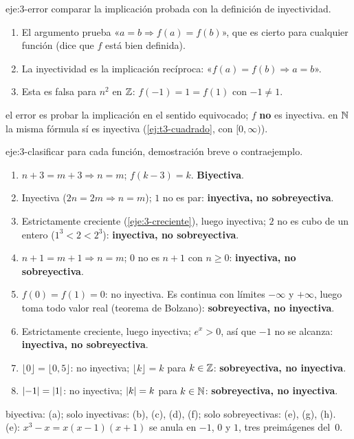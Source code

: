\begin{solucion}{eje:3-error}
\planteamiento comparar la implicación probada con la definición de inyectividad.
\pasos
\begin{enumerate}[label=\arabic*.]
  \item El argumento prueba «$a=b\Rightarrow f(a)=f(b)$», que es cierto para cualquier función (dice que $f$ está bien definida).
  \item La inyectividad es la implicación recíproca: «$f(a)=f(b)\Rightarrow a=b$».
  \item Esta es falsa para $n^{2}$ en $\mathbb{Z}$: $f(-1)=1=f(1)$ con $-1\neq1$.
\end{enumerate}
\resultado el error es probar la implicación en el sentido equivocado; $f$ \textbf{no} es inyectiva.
\comprobacion en $\mathbb{N}$ la misma fórmula sí es inyectiva (\cref{ej:t3-cuadrado}, con $[0,\infty)$).
\end{solucion}

\begin{solucion}{eje:3-clasificar}
\planteamiento para cada función, demostración breve o contraejemplo.
\pasos
\begin{enumerate}[label=(\alph*)]
  \item $n+3=m+3\Rightarrow n=m$; $f(k-3)=k$. \textbf{Biyectiva}.
  \item Inyectiva ($2n=2m\Rightarrow n=m$); $1$ no es par: \textbf{inyectiva, no sobreyectiva}.
  \item Estrictamente creciente (\cref{eje:3-creciente}), luego inyectiva; $2$ no es cubo de un entero ($1^{3}<2<2^{3}$): \textbf{inyectiva, no sobreyectiva}.
  \item $n+1=m+1\Rightarrow n=m$; $0$ no es $n+1$ con $n\ge0$: \textbf{inyectiva, no sobreyectiva}.
  \item $f(0)=f(1)=0$: no inyectiva. Es continua con límites $-\infty$ y $+\infty$, luego toma todo valor real (teorema de Bolzano): \textbf{sobreyectiva, no inyectiva}.
  \item Estrictamente creciente, luego inyectiva; $e^{x}>0$, así que $-1$ no se alcanza: \textbf{inyectiva, no sobreyectiva}.
  \item $\lfloor0\rfloor=\lfloor0{,}5\rfloor$: no inyectiva; $\lfloor k\rfloor=k$ para $k\in\mathbb{Z}$: \textbf{sobreyectiva, no inyectiva}.
  \item $\lvert-1\rvert=\lvert1\rvert$: no inyectiva; $\lvert k\rvert=k$ para $k\in\mathbb{N}$: \textbf{sobreyectiva, no inyectiva}.
\end{enumerate}
\resultado biyectiva: (a); solo inyectivas: (b), (c), (d), (f); solo sobreyectivas: (e), (g), (h).
\comprobacion (e): $x^{3}-x=x(x-1)(x+1)$ se anula en $-1$, $0$ y $1$, tres preimágenes del~0.
\end{solucion}

